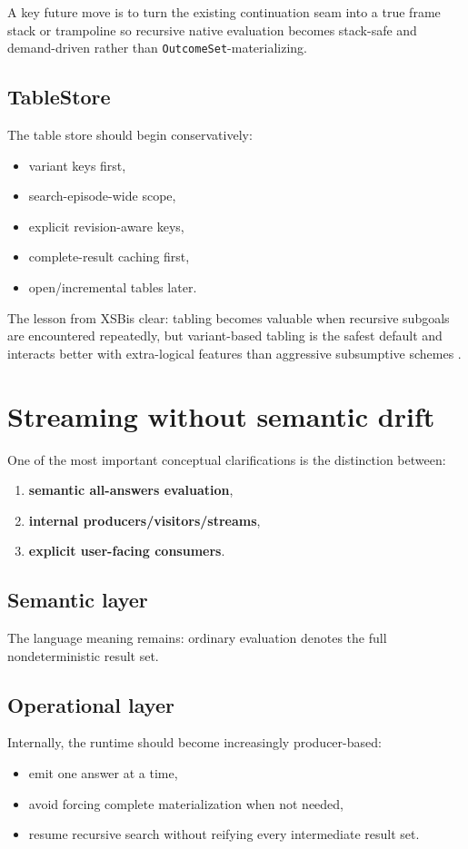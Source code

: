\documentclass[11pt]{article}
\newcommand{\XSB}{\textsc{XSB}}
\begin{document}
A key future move is to turn the existing continuation seam into a true frame stack or trampoline so recursive native evaluation becomes stack-safe and demand-driven rather than \texttt{OutcomeSet}-materializing.

\subsection{TableStore}
The table store should begin conservatively:
\begin{itemize}
    \item variant keys first,
    \item search-episode-wide scope,
    \item explicit revision-aware keys,
    \item complete-result caching first,
    \item open/incremental tables later.
\end{itemize}

The lesson from \XSB is clear: tabling becomes valuable when recursive subgoals are encountered repeatedly, but variant-based tabling is the safest default and interacts better with extra-logical features than aggressive subsumptive schemes \cite{xsb_variant,xsb_subsumption,xsb_meta}.

\section{Streaming without semantic drift}
One of the most important conceptual clarifications is the distinction between:
\begin{enumerate}
    \item \textbf{semantic all-answers evaluation},
    \item \textbf{internal producers/visitors/streams},
    \item \textbf{explicit user-facing consumers}.
\end{enumerate}

\subsection{Semantic layer}
The language meaning remains: ordinary evaluation denotes the full nondeterministic result set.

\subsection{Operational layer}
Internally, the runtime should become increasingly producer-based:
\begin{itemize}
    \item emit one answer at a time,
    \item avoid forcing complete materialization when not needed,
    \item resume recursive search without reifying every intermediate result set.
\end{itemize}
\end{document}
